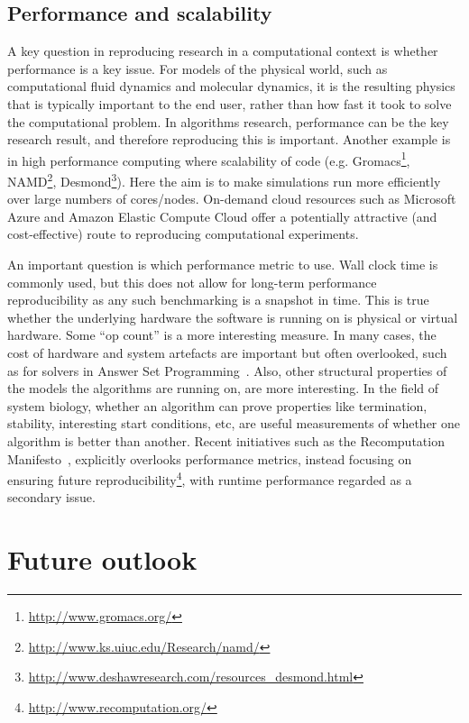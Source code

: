 \documentclass[conference]{IEEEtran}
\begin{document}
\subsection{Performance and scalability}

A key question in reproducing research in a computational context is
whether performance is a key issue. For models of the physical world,
such as computational fluid dynamics and molecular dynamics, it is the
resulting physics that is typically important to the end user, rather
than how fast it took to solve the computational problem. In
algorithms research, performance can be the key research result, and
therefore reproducing this is important. Another example is in high
performance computing where scalability of code
(e.g. Gromacs\footnote{\url{http://www.gromacs.org/}},
NAMD\footnote{\url{http://www.ks.uiuc.edu/Research/namd/}},
Desmond\footnote{\url{http://www.deshawresearch.com/resources_desmond.html}}). Here
the aim is to make simulations run more efficiently over large numbers
of cores/nodes. On-demand cloud resources such as Microsoft Azure and
Amazon Elastic Compute Cloud offer a potentially attractive (and
cost-effective) route to reproducing computational experiments.

An important question is which performance metric to use. Wall clock
time is commonly used, but this does not allow for long-term
performance reproducibility as any such benchmarking is a snapshot in
time. This is true whether the underlying hardware the software is
running on is physical or virtual hardware. Some ``op count'' is a
more interesting measure. In many cases, the cost of hardware and
system artefacts are important but often overlooked, such as for
solvers in Answer Set Programming~\cite{brain+devos:2009}. Also, other
structural properties of the models the algorithms are running on, are
more interesting. In the field of system biology, whether an algorithm
can prove properties like termination, stability, interesting start
conditions, etc, are useful measurements of whether one algorithm is
better than another. Recent initiatives such as the Recomputation
Manifesto~\cite{gent:2013}, explicitly overlooks performance metrics,
instead focusing on ensuring future
reproducibility\footnote{\url{http://www.recomputation.org/}}, with
runtime performance regarded as a secondary issue.

\section{Future outlook}
\end{document}
